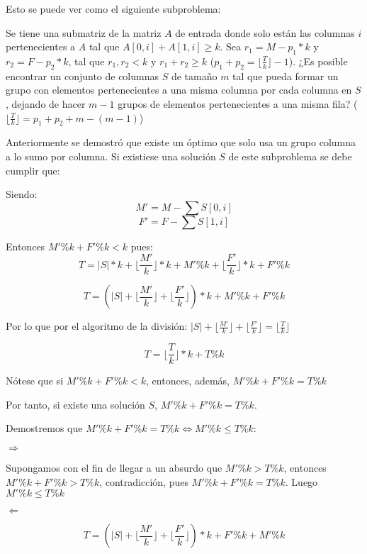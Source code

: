 \documentclass[article]{llncs}
\begin{document}
Esto se puede ver como el siguiente subproblema:

Se tiene una submatriz de la matriz $A$ de entrada donde solo est\'an 
las columnas $i$ pertenecientes a $A$ tal que $A[0, i] + A[1, i] \geq k$.
Sea $r_1 = M - p_1*k$ y $r_2 = F - p_2*k$, tal que $r_1, r_2 < k$ y 
$r_1 + r_2 \geq k$ ($p_1 + p_2 = \lfloor\frac{T}{k}\rfloor - 1$). ¿Es posible encontrar un conjunto de columnas $S$ de 
tamaño $m$ tal que pueda formar un grupo con elementos pertenecientes a 
una misma columna por cada columna en $S$, dejando de hacer $m-1$ grupos 
de elementos pertenecientes a una misma fila? ($\lfloor\frac{T}{k}\rfloor = p_1 + p_2 + m - (m-1)$)

Anteriormente se demostr\'o que existe un \'optimo que solo usa un grupo columna a lo sumo 
por columna. Si existiese una solución $S$ de este subproblema se debe cumplir que:


Siendo:
$$M' = M - \sum S[0,i]$$
$$F' = F - \sum S[1, i]$$

Entonces $M' \% k + F' \% k < k$ pues: 
$$T = |S| * k + \lfloor\frac{M'}{k}\rfloor*k + M'\%k + \lfloor\frac{F'}{k}\rfloor*k + F' \% k$$

$$T = (|S| + \lfloor\frac{M'}{k}\rfloor + \lfloor\frac{F'}{k}\rfloor)*k + M'\%k + F'\%k$$

Por lo que por el algoritmo de la división: $|S| + \lfloor\frac{M'}{k}\rfloor + \lfloor\frac{F'}{k}\rfloor = \lfloor\frac{T}{k}\rfloor$

$$T = \lfloor\frac{T}{k}\rfloor*k + T \% k$$

Nótese que si $M' \% k + F' \% k < k$, entonces, además, $M' \% k + F' \% k = T \% k$

Por tanto, si existe una solución $S$, $M' \% k + F' \% k = T \% k$.

Demostremos que $M' \% k + F' \% k = T \% k \Leftrightarrow M' \% k \leq T \% k$:

$\Rightarrow$

Supongamos con el fin de llegar a un absurdo que $M' \% k > T\%k$,
entonces $M'\%k + F'\%k > T\%k$, contradicci\'on, pues 
$M' \% k + F' \% k = T \% k$. Luego $M' \% k \leq T \% k$

$\Leftarrow$

$$T = (|S| + \lfloor\frac{M'}{k}\rfloor + \lfloor\frac{F'}{k}\rfloor)*k + F'\%k + M'\% k$$
\end{document}
